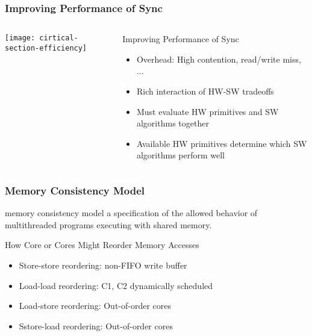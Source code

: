     
\begin{frame}[plain]	
    \frametitle{Improving Performance of Sync}
    
    
    \begin{columns}
        
        \begin{column}{.4\textwidth}
            \texttt{[image: cirtical-section-efficiency]}
        \end{column}
        \begin{column}{.6\textwidth}	
            
            Improving Performance of Sync
            \begin{itemize}
                \item Overhead: High contention, read/write miss, ...
                
                \item  Rich interaction of HW-SW tradeoffs
                \item Must evaluate HW primitives and SW algorithms together
                \item Available HW primitives determine which SW algorithms perform well				                
            \end{itemize}		
        \end{column}
    \end{columns}
    
\end{frame}

    
\begin{frame}[plain]	
    \frametitle{Memory Consistency Model}
    
    \begin{block}{memory consistency model}
        a specification of the allowed    behavior of multithreaded programs executing with shared memory. 
    \end{block} 

    How Core or Cores Might Reorder Memory Accesses
     \begin{itemize}
        \item Store-store reordering: non-FIFO write buffer    
        \item Load-load reordering: C1, C2 dynamically scheduled
        \item Load-store reordering:  Out-of-order cores
        \item Sstore-load reordering:  Out-of-order cores			                
    \end{itemize}
\end{frame}

